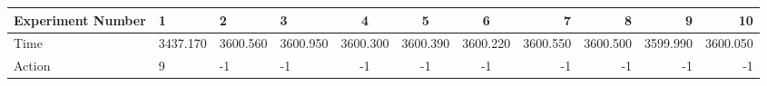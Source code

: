 \documentclass[8pt]{article}
\begin{document}
\begin{landscape}
\begin{tabular}{ | l | l | l | l | c | c | c | r | r | r | r | }
 \hline 
Experiment Number & 1 & 2 & 3 & 4 & 5 & 6 & 7 & 8 & 9 & 10\\ \hline
Time & 3437.170 & 3600.560 & 3600.950 & 3600.300 & 3600.390 & 3600.220 & 3600.550 & 3600.500 & 3599.990 & 3600.050\\ \hline
Action & 9 & -1 & -1 & -1 & -1 & -1 & -1 & -1 & -1 & -1\\ \hline\end{tabular}
\end{landscape}
\end{document}
